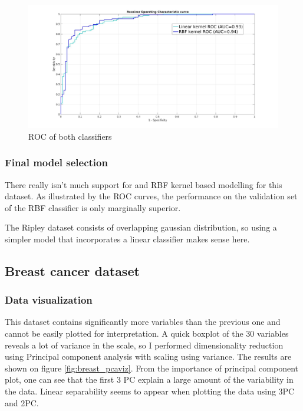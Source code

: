 \documentclass[11pt, a4paper]{article}
\begin{document}
\begin{figure}[H]
    \centering
    \includegraphics[scale=.20]{ripley_roc.jpg}
    \caption{ROC of both classifiers}
    \label{fig:ripley_rbf}
\end{figure}

\subsubsection{Final model selection}

There really isn't much support for and RBF kernel based modelling for
this dataset. As illustrated by the ROC curves, the performance on the
validation set of the RBF classifier is only marginally superior.

The Ripley dataset consists of overlapping gaussian distribution, so
using a simpler model that incorporates a linear classifier makes
sense here.

\subsection{Breast cancer dataset}

\subsubsection{Data visualization}

This dataset contains significantly more variables than the previous
one and cannot be easily plotted for interpretation. A quick boxplot
of the 30 variables reveals a lot of variance in the scale, so I
performed dimensionality reduction using Principal component analysis
with scaling using variance. The results are shown on figure
\ref{fig:breast_pcaviz}. From the importance of principal component
plot, one can see that the first 3 PC explain a large amount of the
variability in the data. Linear separability seems to appear when
plotting the data using 3PC and 2PC. 
\end{document}
